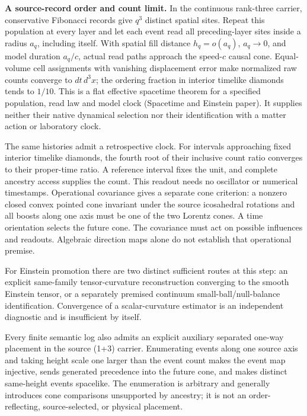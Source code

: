 \textbf{A source-record order and count limit.} In the continuous rank-three
carrier, conservative Fibonacci records give $q^3$ distinct spatial sites.
Repeat this population at every layer and let each event read all preceding-layer
sites inside a radius $a_q$, including itself. With spatial fill distance
$h_q=o(a_q)$, $a_q\to0$, and model duration $a_q/c$, actual read paths
approach the speed-$c$ causal cone. Equal-volume cell assignments with vanishing displacement error make
normalized raw counts converge to $dt\,d^3x$; the ordering fraction in
interior timelike diamonds tends to $1/10$. This is a flat effective
spacetime theorem for a specified population, read law and model clock
(Spacetime and Einstein paper). It supplies neither their native dynamical
selection nor their identification with a matter action or laboratory clock.

The same histories admit a retrospective clock. For intervals approaching
fixed interior timelike diamonds, the fourth root of their inclusive count
ratio converges to their proper-time ratio.
A reference interval fixes the unit, and complete ancestry access supplies
the count. This readout needs no oscillator or numerical timestamps.
Operational covariance gives a separate cone criterion: a nonzero closed
convex pointed cone invariant under the source icosahedral rotations and
all boosts along one axis must be one of the two Lorentz cones. A time
orientation selects the future cone. The covariance must act on possible
influences and readouts. Algebraic direction maps alone do not establish
that operational premise\cite{ophEinstein}.

For Einstein promotion there are two distinct sufficient routes at this step:
an explicit same-family tensor-curvature reconstruction converging to the
smooth Einstein tensor, or a separately premised continuum
small-ball/null-balance identification. Convergence of a scalar-curvature
estimator is an independent diagnostic and is insufficient by itself.

Every finite semantic log also admits an explicit auxiliary separated one-way
placement in the source (1+3) carrier. Enumerating events along one source
axis and taking height scale one larger than the event count makes the event
map injective, sends generated precedence into the future cone, and makes
distinct same-height events spacelike. The enumeration is arbitrary and
generally introduces cone comparisons unsupported by ancestry; it is not an
order-reflecting, source-selected, or physical placement.

